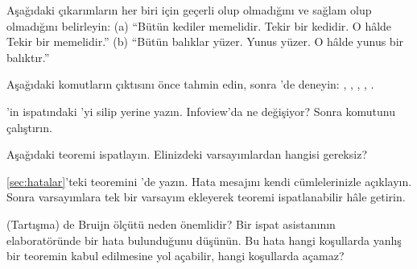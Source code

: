 \begin{alistirmalar}
 Aşağıdaki çıkarımların her biri için geçerli olup
olmadığını ve sağlam olup olmadığını belirleyin:
(a) ``Bütün kediler memelidir. Tekir bir kedidir. O hâlde Tekir bir
memelidir.''
(b) ``Bütün balıklar yüzer. Yunus yüzer. O hâlde yunus bir balıktır.''

 Aşağıdaki komutların çıktısını önce tahmin edin, sonra
\Lean{}'de deneyin:
, , ,
, .

 'in ispatındaki 'yi silip yerine
 yazın. Infoview'da ne değişiyor? Sonra 
komutunu çalıştırın.

 Aşağıdaki teoremi ispatlayın. Elinizdeki varsayımlardan
hangisi gereksiz?
\begin{center}
\end{center}

 \cref{sec:hatalar}'teki  teoremini \Lean{}'de
yazın. Hata mesajını kendi cümlelerinizle açıklayın. Sonra varsayımlara
tek bir varsayım ekleyerek teoremi ispatlanabilir hâle getirin.

 (Tartışma) de Bruijn ölçütü neden önemlidir? Bir ispat
asistanının elaboratöründe bir hata bulunduğunu düşünün. Bu hata hangi
koşullarda yanlış bir teoremin kabul edilmesine yol açabilir, hangi
koşullarda açamaz?
\end{alistirmalar}
